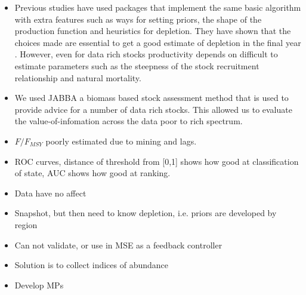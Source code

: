 \begin{itemize}
\item Previous studies have used packages that implement the same basic algorithm with extra features such as ways for setting priors, the shape of the production function and heuristics for depletion. They have shown that the choices made are essential to get a good estimate of depletion in the final year \citep{rosenberg2014developing}. However, even for data rich stocks productivity depends on difficult to estimate parameters such as the steepness of the stock recruitment relationship and natural mortality.  
\item We used JABBA a biomass based stock assessment method that is used to provide advice for a number of data rich stocks. This allowed us to evaluate the value-of-infomation across the data poor to rich spectrum.
\item $F/F_{MSY}$ poorly estimated due to mining and lags.
\item ROC curves, distance of threshold from [0,1] shows how good at classification of state, AUC shows how good at ranking.
\item Data have no affect
\item Snapshot, but then need to know depletion, i.e. priors are developed by region
\item Can not validate, or use in MSE as a feedback controller
\item Solution is to collect indices of abundance
\item Develop MPs \citep{fischer2020hcr}


\end{itemize}
